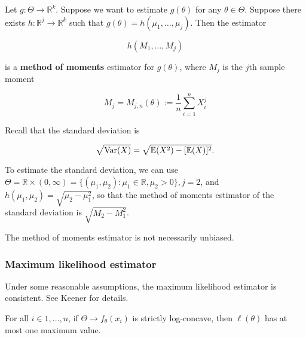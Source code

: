 \begin{definition} Let \(g:\Theta \to \mathbb{R}^k\). Suppose we want to estimate \(g(\theta)\) for any \(\theta \in \Theta\). Suppose there exists \(h: \mathbb{R}^j \to \mathbb{R}^k\) such that \(g(\theta) = h(\mu_1, \ldots, \mu_j)\). Then the estimator

\[
h(M_1, \ldots, M_j)
\]

is a \textbf{method of moments} estimator for \(g(\theta)\), where \(M_j\) is the \(j\)th sample moment

\[
M_j = M_{j,n}(\theta) := \frac{1}{n} \sum_{i=1}^n X_i^j
\]

\end{definition}

\begin{example} Recall that the standard deviation is

\[
\sqrt{\Var(X)} = \sqrt{\E(X^2) - [\E(X)]^2}.
\]

To estimate the standard deviation, we can use \(\Theta = \mathbb{R} \times (0, \infty) = \{(\mu_1, \mu_2): \mu_1 \in \mathbb{R}, \mu_2 > 0\}, j=2\), and \(h(\mu_1, \mu_2) = \sqrt{\mu_2 - \mu_1^2}\), so that the method of moments estimator of the standard deviation is \(\sqrt{M_2 - M_1^2}\).

\end{example}

\begin{remark}The method of moments estimator is not necessarily unbiased.

\end{remark}

\subsubsection{Maximum likelihood estimator}

\begin{remark}Under some reasonable assumptions, the maximum likelihood estimator is consistent. See Keener for details.

\end{remark}

\begin{proposition} For all \(i \in 1, \ldots, n\), if \(\Theta \to f_\theta(x_i)\) is strictly log-concave, then \(\ell(\theta)\) has at most one maximum value.

\end{proposition}

